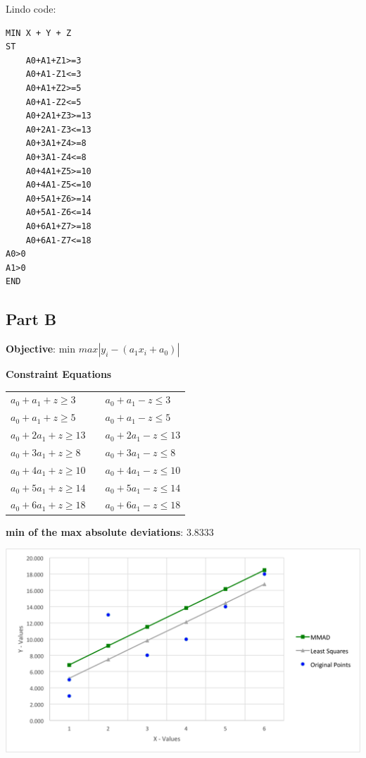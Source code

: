 \documentclass[11pt,letterpaper]{article}
\begin{document}
Lindo code:\vspace{8pt}

\begin{verbatim}
MIN X + Y + Z
ST
    A0+A1+Z1>=3
    A0+A1-Z1<=3
    A0+A1+Z2>=5
    A0+A1-Z2<=5
    A0+2A1+Z3>=13
    A0+2A1-Z3<=13
    A0+3A1+Z4>=8
    A0+3A1-Z4<=8
    A0+4A1+Z5>=10
    A0+4A1-Z5<=10
    A0+5A1+Z6>=14
    A0+5A1-Z6<=14
    A0+6A1+Z7>=18
    A0+6A1-Z7<=18
A0>0
A1>0
END
\end{verbatim}

\subsection*{Part B}
\textbf{Objective}: min $max |y_i -  (a_1x_i + a_0)|$\vspace{8pt}

\textbf{Constraint Equations}

\begin{tabular}{l l l}
$a_0+a_1+z\geq3$		&  & $a_0+a_1-z\leq3$\\
$a_0+a_1+z\geq5$ 		& & $a_0+a_1-z\leq5$\\
$a_0+2a_1+z\geq13$	& & $a_0+2a_1-z\leq13$\\
$a_0+3a_1+z\geq8$		& & $a_0+3a_1-z\leq8$\\
$a_0+4a_1+z\geq10$	& & $a_0+4a_1-z\leq10$\\
$a_0+5a_1+z\geq14$	& & $a_0+5a_1-z\leq14$\\
$a_0+6a_1+z\geq18$	& & $a_0+6a_1-z\leq18$\\
\end{tabular}\vspace{8pt}


\textbf{min of the max absolute deviations}: 3.8333\vspace{8pt}

\centerline{\includegraphics[width=7in]{mmad.png}}
\end{document}
